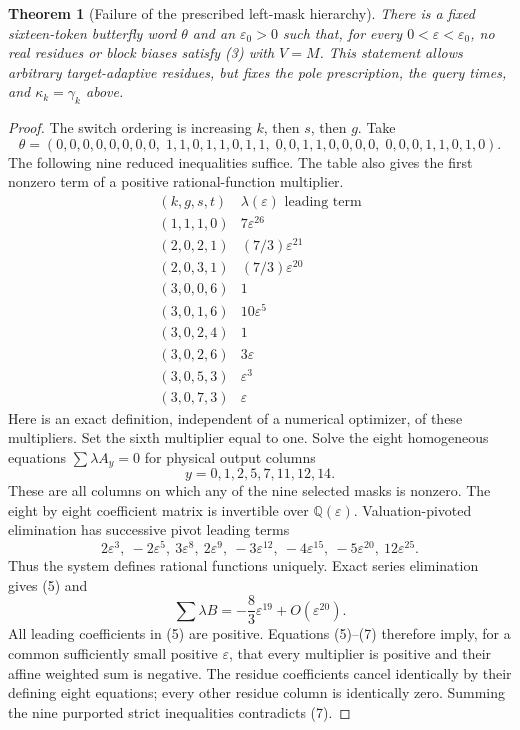 \documentclass{article}
\newtheorem{theorem}{Theorem}
\begin{document}
\begin{theorem}[Failure of the prescribed left-mask hierarchy]
There is a fixed sixteen-token butterfly word $\theta$ and an
$\varepsilon_0>0$ such that, for every $0<\varepsilon<\varepsilon_0$,
no real residues or block biases satisfy (3) with $V=M$.
This statement allows arbitrary target-adaptive residues, but fixes the
pole prescription, the query times, and $\kappa_k=\gamma_k$ above.
\end{theorem}
\begin{proof}
The switch ordering is increasing $k$, then $s$, then $g$.
Take
\[
\theta=(0,0,0,0,0,0,0,0,\;
1,1,0,1,1,0,1,1,\;
0,0,1,1,0,0,0,0,\;
0,0,0,1,1,0,1,0).
\]
The following nine reduced inequalities suffice.  The table also gives
the first nonzero term of a positive rational-function multiplier.
\[
\begin{array}{c|c}
(k,g,s,t)&\lambda(\varepsilon)\text{ leading term}\\\hline
(1,1,1,0)&7\varepsilon^{26}\\
(2,0,2,1)&(7/3)\varepsilon^{21}\\
(2,0,3,1)&(7/3)\varepsilon^{20}\\
(3,0,0,6)&1\\
(3,0,1,6)&10\varepsilon^5\\
(3,0,2,4)&1\\
(3,0,2,6)&3\varepsilon\\
(3,0,5,3)&\varepsilon^3\\
(3,0,7,3)&\varepsilon
\end{array}
\tag{5}
\]
Here is an exact definition, independent of a numerical optimizer, of
these multipliers.  Set the sixth multiplier equal to one.  Solve the
eight homogeneous equations $\sum\lambda A_y=0$ for physical output
columns
\[
 y=0,1,2,5,7,11,12,14.
\]
These are all columns on which any of the nine selected masks is nonzero.
The eight by eight coefficient matrix is invertible over
$\mathbb Q(\varepsilon)$.  Valuation-pivoted elimination has successive
pivot leading terms
\[
2\varepsilon^3,\ -2\varepsilon^5,\ 3\varepsilon^8,
\ 2\varepsilon^9,\ -3\varepsilon^{12},\ -4\varepsilon^{15},
\ -5\varepsilon^{20},\ 12\varepsilon^{25}.
\tag{6}
\]
Thus the system defines rational functions uniquely.  Exact series
elimination gives (5) and
\[
 \sum\lambda B=-\frac83\varepsilon^{19}+O(\varepsilon^{20}).
 \tag{7}
\]
All leading coefficients in (5) are positive.  Equations (5)--(7)
therefore imply, for a common sufficiently small positive $\varepsilon$,
that every multiplier is positive and their affine weighted sum is
negative.  The residue coefficients cancel identically by their defining
eight equations; every other residue column is identically zero.
Summing the nine purported strict inequalities contradicts (7).
\end{proof}
\end{document}
